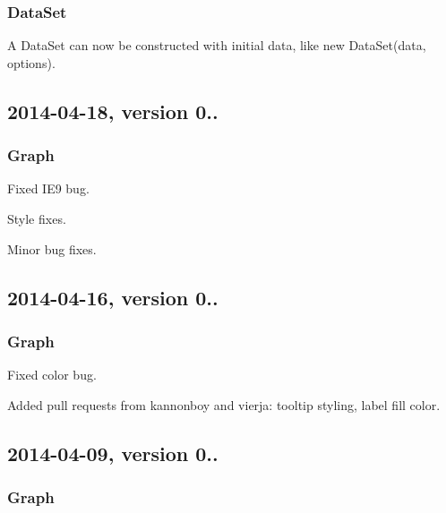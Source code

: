 \subsubsection*{Data\+Set}


\begin{DoxyItemize}
\item A Data\+Set can now be constructed with initial data, like {\ttfamily new Data\+Set(data, options)}.
\end{DoxyItemize}

\subsection*{2014-\/04-\/18, version 0..}

\subsubsection*{Graph}


\begin{DoxyItemize}
\item Fixed I\+E9 bug.
\item Style fixes.
\item Minor bug fixes.
\end{DoxyItemize}

\subsection*{2014-\/04-\/16, version 0..}

\subsubsection*{Graph}


\begin{DoxyItemize}
\item Fixed color bug.
\item Added pull requests from kannonboy and vierja\+: tooltip styling, label fill color.
\end{DoxyItemize}

\subsection*{2014-\/04-\/09, version 0..}

\subsubsection*{Graph}


